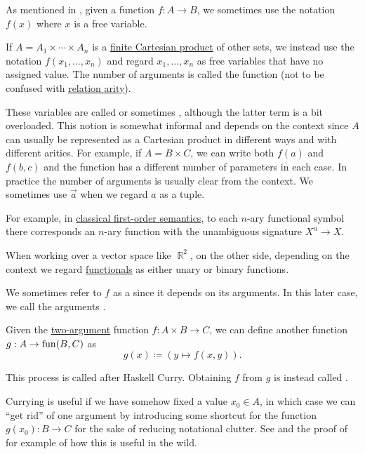 \begin{definition}\label{def:function_arguments}
  As mentioned in , given a function \( f: A \to B \), we sometimes use the notation \( f(x) \) where \( x \) is a free variable.

  If \( A = A_1 \times \cdots \times A_n \) is a \hyperref[def:binary_cartesian_product]{finite Cartesian product} of other sets, we instead use the notation \( f(x_1, \ldots, x_n) \) and regard \( x_1, \ldots, x_n \) as free variables that have no assigned value. The number of arguments is called the function  (not to be confused with \hyperref[def:relation/arity]{relation arity}).

  These variables are called  or sometimes , although the latter term is a bit overloaded. This notion is somewhat informal and depends on the context since \( A \) can usually be represented as a Cartesian product in different ways and with different arities. For example, if \( A = B \times C \), we can write both \( f(a) \) and \( f(b, c) \) and the function has a different number of parameters in each case. In practice the number of arguments is usually clear from the context. We sometimes use \( \overrightarrow{a} \) when we regard \( a \) as a tuple.

  For example, in \hyperref[def:first_order_semantics]{classical first-order semantics}, to each \( n \)-ary functional symbol there corresponds an \( n \)-ary function with the unambiguous signature \( X^n \to X \).

  When working over a vector space like \( \BbbR^2 \), on the other side, depending on the context we regard \hyperref[rem:functional]{functionals} as either unary or binary functions.

  We sometimes refer to \( f \) as a  since it depends on its arguments. In this later case, we call the arguments .
\end{definition}

\begin{remark}\label{rem:currying}
  Given the \hyperref[def:function_arguments]{two-argument} function \( f: A \times B \to C \), we can define another function \( g: A \to \operatorname{fun}(B, C) \) as
  \begin{equation*}
    g(x) \coloneqq (y \mapsto f(x, y)).
  \end{equation*}

  This process is called  after Haskell Curry. Obtaining \( f \) from \( g \) is instead called .

  Currying is useful if we have somehow fixed a value \( x_0 \in A \), in which case we can \enquote{get rid} of one argument by introducing some shortcut for the function \( g(x_0): B \to C \) for the sake of reducing notational clutter. See  and the proof of  for example of how this is useful in the wild.
\end{remark}

